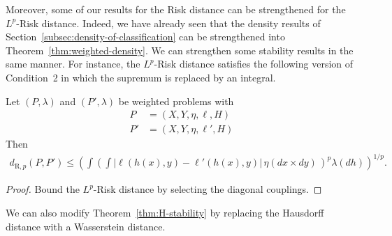 \documentclass[twoside,11pt]{article}
\newcommand{\dexp}[1][]{d_{\mathrm{R}#1}}
\begin{document}
Moreover, some of our results for the Risk distance can be strengthened for the $L^p$-Risk distance. Indeed, we have already seen that the density results of Section~\ref{subsec:density-of-classification} can be strengthened into Theorem~\ref{thm:weighted-density}. We can strengthen some stability results in the same manner. For instance, the $L^p$-Risk distance satisfies the following version of Condition~2 in which the supremum is replaced by an integral.
\begin{proposition}
    Let $(P,\lambda)$ and $(P',\lambda)$ be weighted problems with
    \begin{align*}
        P &= (X,Y,\eta,\ell,H)\\
        P' &= (X,Y,\eta,\ell',H)
    \end{align*}
    Then
    \begin{align*}
        \dexp[,p](P,P') \leq \left(\int \left( \int
            \big| \ell(h(x),y) - \ell'(h(x),y) \big | \,\eta(dx{\times} dy)\,
        \right)^p
        \lambda(dh)
        \right)^{1/p}.
    \end{align*}
\end{proposition}
\begin{proof}
    Bound the $L^p$-Risk distance by selecting the diagonal couplings.
\end{proof}

We can also modify Theorem~\ref{thm:H-stability} by replacing the Hausdorff distance with a Wasserstein distance.
\end{document}
